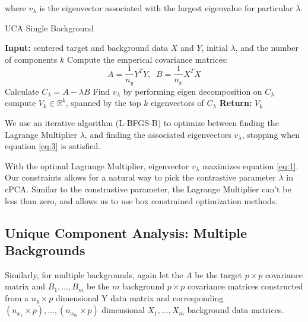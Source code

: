 \documentclass[12pt]{article}
\begin{document}
    where $v_\lambda$ is the eigenvector associated with the largest eigenvalue for particular $\lambda$.
    
\begin{algorithm}[ht]
\label{alg:uca-single}
\caption{UCA Single Background}
\SetAlgoLined
  \textbf{Input:} centered target and background data $X$ and $Y$, initial $\lambda$, and the number of components $k$ \; 
  Compute the emperical covariance matrices:
  \[A = \frac{1}{n_y}Y^TY,\;\; B = \frac{1}{n_x}X^TX \] \; Calculate  $C_\lambda = A - \lambda B$ \;
  Find $v_\lambda$ by performing eigen decomposition on $C_\lambda$\;
  compute $V_k\in \mathbb{R}^k$, spanned by the top $k$ eigenvectors of $C_\lambda$\;
  \textbf{Return:} $V_k$ \;
\end{algorithm}
    We use an iterative algorithm (L-BFGS-B) \cite{byrd1995limited} to optimize between finding the Lagrange Multiplier $\lambda$, and finding the associated eigenvectors $v_\lambda$, stopping when equation \ref{eq:3} is satisfied.
     

 With the optimal Lagrange Multiplier, eigenvector $v_\lambda$ maximizes equation \ref{eq:1}.
Our constraints allows for a natural way to pick the contrastive parameter $\lambda$ in cPCA. Similar to the constrastive parameter, the Lagrange Multiplier can't be less than zero, and allows us to use box constrained optimization methods. 






\subsection{Unique Component Analysis: Multiple Backgrounds}
Similarly, for multiple backgrounds, again let the $A$ be the target $p \times p$ covariance matrix and $ B_1, \ldots, B_m$ be the $m$ background $p \times p$ covariance matrices constructed from a $n_y \times p$ dimensional Y data matrix and corresponding $(n_{x_1} \times p), \ldots, (n_{x_m}\times p)$ dimensional $X_1, \ldots, X_m$ background data matrices.
\end{document}
